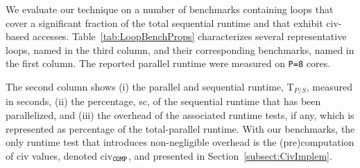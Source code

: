 \documentclass{sig-alternate}
\begin{document}
We evaluate our technique on a number of benchmarks containing loops that cover a significant
fraction of the total sequential runtime and that exhibit {\sc civ}-based accesses.
%
Table~\ref{tab:LoopBenchProps} characterizes several representative loops, named in 
the third column, and their corresponding benchmarks, named in the first column.
The reported parallel runtime were measured on {\tt P=8} cores.
%

The second column shows 
(i)   the parallel and sequential runtime, T$_{P/S}$, measured in seconds,
(ii)  the percentage, {\sc sc}, of the sequential runtime that has been parallelized, and 
(iii) the overhead of the associated runtime tests, if any, which is represented as percentage of
        the total-parallel runtime. With our benchmarks, the only runtime test that introduces
        non-negligible overhead is the (pre)computation of {\sc civ} values, 
        denoted {\sc civ}$_{\tt{}COMP}$, and presented in Section~\ref{subsect:CivImplem}.   
\end{document}
